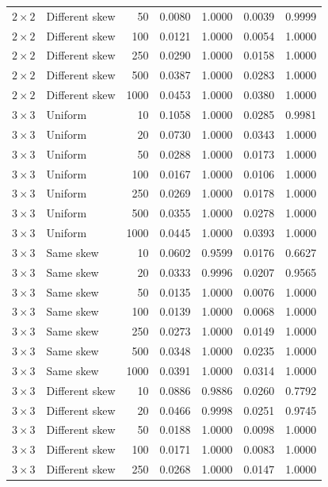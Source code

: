\begin{longtable}{@{}llrrrrr@{}}
\(2\times2\) & Different skew & 50 & 0.0080 & 1.0000 & 0.0039 & 0.9999 \\
\(2\times2\) & Different skew & 100 & 0.0121 & 1.0000 & 0.0054 & 1.0000 \\
\(2\times2\) & Different skew & 250 & 0.0290 & 1.0000 & 0.0158 & 1.0000 \\
\(2\times2\) & Different skew & 500 & 0.0387 & 1.0000 & 0.0283 & 1.0000 \\
\(2\times2\) & Different skew & 1000 & 0.0453 & 1.0000 & 0.0380 & 1.0000 \\
\addlinespace
\(3\times3\) & Uniform & 10 & 0.1058 & 1.0000 & 0.0285 & 0.9981 \\
\(3\times3\) & Uniform & 20 & 0.0730 & 1.0000 & 0.0343 & 1.0000 \\
\(3\times3\) & Uniform & 50 & 0.0288 & 1.0000 & 0.0173 & 1.0000 \\
\(3\times3\) & Uniform & 100 & 0.0167 & 1.0000 & 0.0106 & 1.0000 \\
\(3\times3\) & Uniform & 250 & 0.0269 & 1.0000 & 0.0178 & 1.0000 \\
\(3\times3\) & Uniform & 500 & 0.0355 & 1.0000 & 0.0278 & 1.0000 \\
\(3\times3\) & Uniform & 1000 & 0.0445 & 1.0000 & 0.0393 & 1.0000 \\
\addlinespace
\(3\times3\) & Same skew & 10 & 0.0602 & 0.9599 & 0.0176 & 0.6627 \\
\(3\times3\) & Same skew & 20 & 0.0333 & 0.9996 & 0.0207 & 0.9565 \\
\(3\times3\) & Same skew & 50 & 0.0135 & 1.0000 & 0.0076 & 1.0000 \\
\(3\times3\) & Same skew & 100 & 0.0139 & 1.0000 & 0.0068 & 1.0000 \\
\(3\times3\) & Same skew & 250 & 0.0273 & 1.0000 & 0.0149 & 1.0000 \\
\(3\times3\) & Same skew & 500 & 0.0348 & 1.0000 & 0.0235 & 1.0000 \\
\(3\times3\) & Same skew & 1000 & 0.0391 & 1.0000 & 0.0314 & 1.0000 \\
\addlinespace
\(3\times3\) & Different skew & 10 & 0.0886 & 0.9886 & 0.0260 & 0.7792 \\
\(3\times3\) & Different skew & 20 & 0.0466 & 0.9998 & 0.0251 & 0.9745 \\
\(3\times3\) & Different skew & 50 & 0.0188 & 1.0000 & 0.0098 & 1.0000 \\
\(3\times3\) & Different skew & 100 & 0.0171 & 1.0000 & 0.0083 & 1.0000 \\
\(3\times3\) & Different skew & 250 & 0.0268 & 1.0000 & 0.0147 & 1.0000 \\

\end{longtable}

